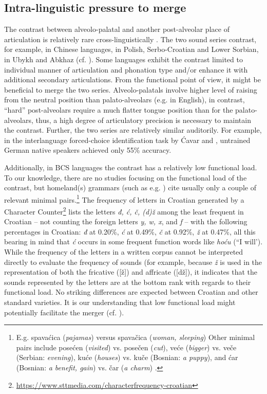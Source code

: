 \documentclass[output=paper,modfonts,nonflat,
]{langsci/langscibook}
\begin{document}
\subsection{Intra-linguistic pressure to merge}
The contrast between alveolo-palatal and another post-alveolar place of articulation is relatively rare cross-linguistically \citep{Maddieson1984}. The two sound series contrast, for example, in Chinese languages, in Polish, Serbo-Croatian and Lower Sorbian, in Ubykh and Abkhaz (cf. \citealt{LadefogedMaddieson1996}). Some languages exhibit the contrast limited to individual manner of articulation and phonation type and/or enhance it with additional secondary articulations. From the functional point of view, it might be beneficial to merge the two series. Alveolo-palatals involve higher level of raising from the neutral position than palato-alveolars (e.g. in English), in contrast, “hard” post-alveolars require a much flatter tongue position than for the palato-alveolars, thus, a high degree of articulatory precision is necessary to maintain the contrast. Further, the two series are relatively similar auditorily. For example, in the interlanguage forced-choice identification task by Ćavar and \citet{Hamann2011}, untrained German native speakers achieved only 55\% accuracy.



Additionally, in BCS languages the contrast has a relatively low functional load. To our knowledge, there are no studies focusing on the functional load of the contrast, but homeland(s) grammars (such as e.g. \citealt{Brozović1991}) cite usually only a couple of relevant minimal pairs.\footnote{E.g. spavaćica (\textit{pajamas}) versus spavačica (\textit{woman, sleeping}) Other minimal pairs include posećen (\textit{visited}) vs. posečen (\textit{cut}), veće (\textit{bigger}) vs. veče (Serbian: \textit{evening}), kuće (\textit{houses}) vs. kuče (Bosnian: \textit{a puppy}), and ćar (Bosnian: \textit{a benefit, gain}) vs. čar (\textit{a charm}) \citep{Kibo2004}.} The frequency of letters in Croatian generated by a Character Counter\footnote{\url{https://www.sttmedia.com/characterfrequency-croatian}} lists the letters \textit{đ, ć, č, (d)ž} among the least frequent in Croatian – not counting the foreign letters \textit{y, w, x}, and \textit{f} – with the following percentages in Croatian: \textit{đ} at 0.20\%, \textit{ć} at 0.49\%, \textit{č} at 0.92\%, \textit{ž} at 0.47\%, all this bearing in mind that \textit{ć} occurs in some frequent function words like \textit{hoću} (“I will’). While the frequency of the letters in a written corpus cannot be interpreted directly to evaluate the frequency of sounds (for example, because \textit{ž} is used in the representation of both the fricative ([ž]) and affricate ([dž]), it indicates that the sounds represented by the letters are at the bottom rank with regards to their functional load. No striking differences are expected between Croatian and other standard varieties. It is our understanding that low functional load might potentially facilitate the merger (cf. \citealt{Wedeletal2013}).
\end{document}
